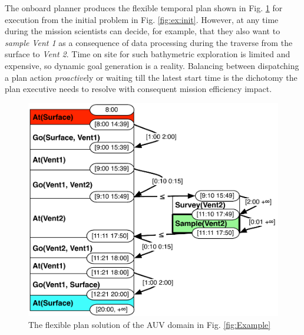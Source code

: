 The onboard planner produces the flexible temporal plan shown in
Fig. \ref{fig:ex:plan} for execution from the initial problem in
Fig. \ref{fig:ex:init}. However, at any time during the mission
scientists can decide, for example, that they also want to {\em
  sample} {\em Vent 1} as a consequence of data processing during the
traverse from the surface to {\em Vent 2}.  Time on site for such
bathymetric exploration is limited and expensive, so dynamic goal
generation is a reality.  Balancing between dispatching a plan action
\emph{proactive}ly or waiting till the latest start time is the
dichotomy the plan executive needs to resolve with consequent mission
efficiency impact.


\begin{figure}[!htb]
  \centering
  \includegraphics[width=0.8\columnwidth]{figs/example_plan}
  \vskip-2mm
  \caption{\small The flexible plan solution of the AUV domain in
    Fig. \ref{fig:Example}}
  \label{fig:ex:plan}
\end{figure}

